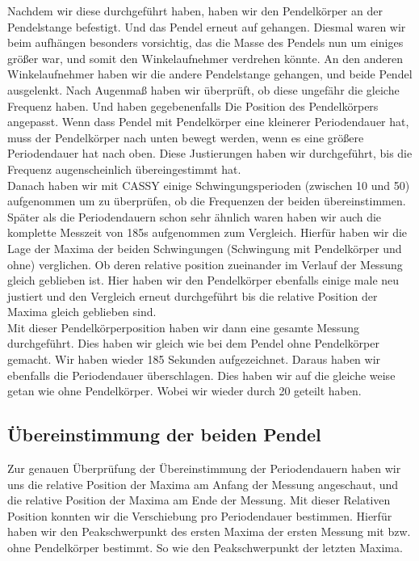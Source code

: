 \documentclass[twoside]{protokoll}
\begin{document}
Nachdem wir diese durchgeführt haben, haben wir den Pendelkörper an der Pendelstange befestigt. 
Und das Pendel erneut auf gehangen. 
Diesmal waren wir beim aufhängen besonders vorsichtig, das die Masse des Pendels nun um einiges größer war, und somit den Winkelaufnehmer verdrehen könnte.
An den anderen Winkelaufnehmer haben wir die andere Pendelstange gehangen, und beide Pendel ausgelenkt.
Nach Augenmaß haben wir überprüft, ob diese ungefähr die gleiche Frequenz haben. Und haben gegebenenfalls Die Position des Pendelkörpers angepasst.
Wenn dass Pendel mit Pendelkörper eine kleinerer Periodendauer hat, muss der Pendelkörper nach unten bewegt werden, wenn es eine größere Periodendauer hat nach oben.
Diese Justierungen haben wir durchgeführt, bis die Frequenz augenscheinlich übereingestimmt hat. \\

Danach haben wir mit CASSY einige Schwingungsperioden (zwischen 10 und 50) aufgenommen um zu überprüfen, ob die Frequenzen der beiden übereinstimmen.
Später als die Periodendauern schon sehr ähnlich waren haben wir auch die komplette Messzeit von 185s aufgenommen zum Vergleich. 
Hierfür haben wir die Lage der Maxima der beiden Schwingungen (Schwingung mit Pendelkörper und ohne) verglichen.
Ob deren relative position zueinander im Verlauf der Messung gleich geblieben ist.
Hier haben wir den Pendelkörper ebenfalls einige male neu justiert und den Vergleich erneut durchgeführt bis die relative Position der Maxima gleich geblieben sind.\\

Mit dieser Pendelkörperposition haben wir dann eine gesamte Messung durchgeführt.
Dies haben wir gleich wie bei dem Pendel ohne Pendelkörper gemacht. Wir haben wieder 185 Sekunden aufgezeichnet. 
Daraus haben wir ebenfalls die Periodendauer überschlagen. 
Dies haben wir auf die gleiche weise getan wie ohne Pendelkörper. Wobei wir wieder durch 20 geteilt haben.

\subsection{Übereinstimmung der beiden Pendel}

Zur genauen Überprüfung der Übereinstimmung der Periodendauern haben wir uns die relative Position der Maxima am Anfang der Messung angeschaut, und die relative Position der Maxima am Ende der Messung. 
Mit dieser Relativen Position konnten wir die Verschiebung pro Periodendauer bestimmen.
Hierfür haben wir den Peakschwerpunkt des ersten Maxima der ersten Messung mit bzw. ohne Pendelkörper bestimmt. 
So wie den Peakschwerpunkt der letzten Maxima. 
\end{document}
